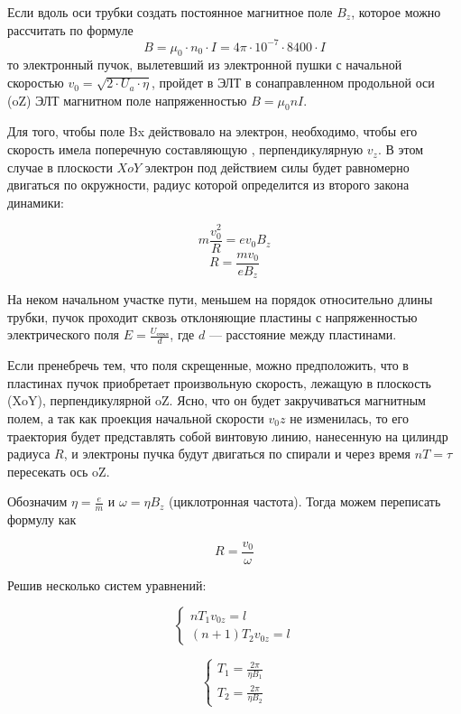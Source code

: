 Если вдоль оси трубки создать постоянное магнитное поле $B_z$, которое можно рассчитать по формуле
\begin{equation}
	B=\mu_0\cdot{}n_0\cdot{}I=4\pi\cdot10^{-7}\cdot8400\cdot{}I
\end{equation}
то электронный пучок, вылетевший из электронной пушки с начальной скоростью $v_0=\sqrt{2\cdot{U_a}\cdot\eta}$, пройдет в ЭЛТ в сонаправленном продольной оси (oZ) ЭЛТ магнитном поле напряженностью $B=\mu_0nI$. 

Для того, чтобы поле Bx действовало на электрон, необходимо, чтобы его скорость имела поперечную составляющую , перпендикулярную $v_z$. В этом случае в плоскости $XoY$ электрон под действием силы  будет равномерно двигаться по окружности, радиус которой определится из второго закона динамики:

\begin{equation}
	m\frac{v_0^2}{R}=ev_0B_z
\end{equation}
\begin{equation}
	R=\frac{mv_0}{eB_z}
\end{equation}

На неком начальном участке пути, меньшем на порядок относительно длины трубки, пучок проходит сквозь отклоняющие пластины с напряженностью электрического поля $E=\frac{U_\text{откл}}{d}$, где $d$ --- расстояние между пластинами.

Если пренебречь тем, что поля скрещенные, можно предположить, что в пластинах пучок приобретает произвольную скорость, лежащую в плоскость (XoY), перпендикулярной oZ. Ясно, что он будет закручиваться магнитным полем, а так как проекция начальной скорости $v_0z$ не изменилась, то
его траектория будет представлять собой винтовую линию, нанесенную на цилиндр радиуса $R$, и электроны пучка будут двигаться по спирали и через время $nT=\tau$ пересекать ось oZ.

Обозначим $\eta=\frac{e}{m}$ и $\omega=\eta{}B_z$ (циклотронная частота). Тогда можем переписать формулу как

\begin{equation}
	R=\frac{v_0}{\omega}
\end{equation}

Решив несколько систем уравнений:

$$
\begin{cases}
nT_1v_{0z}=l\\
(n+1)T_2v_{0z}=l
\end{cases}
$$

$$
\begin{cases}
T_1=\frac{2\pi}{\eta{}B_1}\\
T_2=\frac{2\pi}{\eta{}B_2}
\end{cases}
$$

